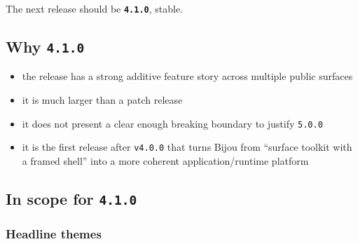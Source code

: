 The next release should be \textbf{\texttt{4\allowbreak{}.\allowbreak{}1\allowbreak{}.\allowbreak{}0}}, stable.

\subsection{\texorpdfstring{Why \texttt{4\allowbreak{}.\allowbreak{}1\allowbreak{}.\allowbreak{}0}}{Why }}\label{record-202-why-4.1.0}

\begin{itemize}
\tightlist
\item
  the release has a strong additive feature story across multiple public surfaces
\item
  it is much larger than a patch release
\item
  it does not present a clear enough breaking boundary to justify \texttt{5\allowbreak{}.\allowbreak{}0\allowbreak{}.\allowbreak{}0}
\item
  it is the first release after \texttt{v\allowbreak{}4\allowbreak{}.\allowbreak{}0\allowbreak{}.\allowbreak{}0} that turns Bijou from ``surface toolkit with a framed shell'' into a more coherent application/runtime platform
\end{itemize}

\subsection{\texorpdfstring{In scope for \texttt{4\allowbreak{}.\allowbreak{}1\allowbreak{}.\allowbreak{}0}}{In scope for }}\label{record-202-in-scope-for-4.1.0}

\subsubsection{Headline themes}\label{record-202-headline-themes}

